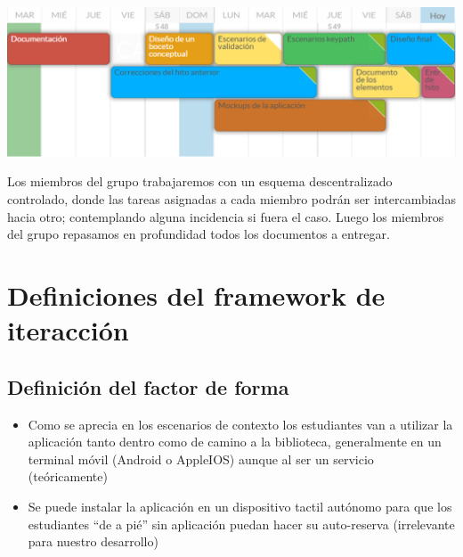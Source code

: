 \documentclass[12pt]{article}
\begin{document}
\begin{itemize}
\begin{center}
	\includegraphics[width=1\textwidth]{planificacionHito3.png}
\end{center}
\phantom{10}

Los miembros del grupo trabajaremos con un esquema descentralizado controlado, donde las tareas asignadas a cada miembro podrán ser intercambiadas hacia otro; contemplando alguna incidencia si fuera el caso. Luego los miembros del grupo repasamos en profundidad todos los documentos a entregar.

\end{itemize}
\newpage


\section{Definiciones del  framework  de iteracción}

\subsection{Definición del factor de forma}
\begin{itemize}

\item Como se aprecia en los escenarios de contexto los estudiantes van a utilizar la aplicación tanto dentro como de camino a la biblioteca, generalmente en un terminal móvil (Android o AppleIOS) aunque al ser un servicio (teóricamente)

\item Se puede instalar la aplicación en un dispositivo tactil autónomo para que los estudiantes “de a pié” sin aplicación puedan hacer su auto-reserva (irrelevante para nuestro desarrollo)

\end{itemize}
\end{document}
